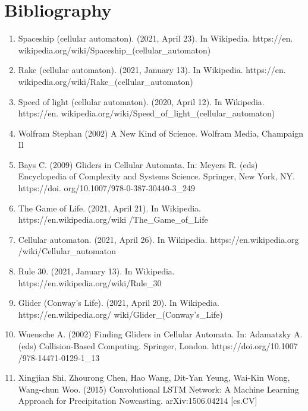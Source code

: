 \documentclass[12pt]{article}
\numberwithin{figure}{section} %
\begin{document}
\iffalse
\newpage
\section{Bibliography}
\begin{enumerate}[topsep=0pt,itemsep=-1ex,partopsep=1ex,parsep=1ex]
\item Spaceship (cellular automaton). (2021, April 23). In Wikipedia. https://en.\linebreak
wikipedia.org/wiki/Spaceship\_(cellular\_automaton)
\item Rake (cellular automaton). (2021, January 13). In Wikipedia. https://en.\linebreak
wikipedia.org/wiki/Rake\_(cellular\_automaton)
\item Speed of light (cellular automaton). (2020, April 12). In Wikipedia. https://en.\linebreak
wikipedia.org/wiki/Speed\_of\_light\_(cellular\_automaton)
\item Wolfram Stephan (2002) A New Kind of Science. Wolfram Media, Champaign Il
\item Bays C. (2009) Gliders in Cellular Automata. In: Meyers R. (eds) Encyclopedia of Complexity and Systems Science. Springer, New York, NY. 
https://doi.\linebreak
org/10.1007/978-0-387-30440-3\_249
\item The Game of Life. (2021, April 21). In Wikipedia. 
https://en.wikipedia.org/wiki\linebreak
/The\_Game\_of\_Life
\item Cellular automaton. (2021, April 26). In Wikipedia. 
https://en.wikipedia.org\linebreak
/wiki/Cellular\_automaton
\item Rule 30. (2021, January 13). In Wikipedia. 
https://en.wikipedia.org/wiki/Rule\_30
\item Glider (Conway’s Life). (2021, April 20). In Wikipedia. 
https://en.wikipedia.org/\linebreak
wiki/Glider\_(Conway’s\_Life)
\item Wuensche A. (2002) Finding Gliders in Cellular Automata. In: Adamatzky A. (eds) Collision-Based Computing. Springer, London. 
https://doi.org/10.1007\linebreak
/978-14471-0129-1\_13
\item Xingjian Shi, Zhourong Chen, Hao Wang, Dit-Yan Yeung, Wai-Kin Wong, Wang-chun Woo. (2015) Convolutional LSTM Network: A Machine Learning Approach for Precipitation Nowcasting. arXiv:1506.04214 [cs.CV]

\end{enumerate}
\end{document}
